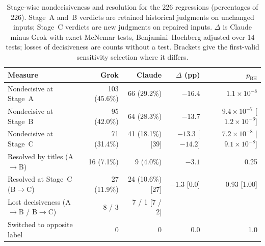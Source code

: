 \begin{table}[t]
\centering
\caption{Stage-wise nondecisiveness and resolution for the 226 regressions (percentages of 226). Stage~A and~B verdicts are retained historical judgments on unchanged inputs; Stage~C verdicts are new judgments on repaired inputs. $\Delta$ is Claude minus Grok with exact McNemar tests, Benjamini--Hochberg adjusted over 14 tests; losses of decisiveness are counts without a test. Brackets give the first-valid sensitivity selection where it differs.}
\label{tab:stage}
\small
\setlength{\tabcolsep}{4pt}
\begin{tabular}{lrrrr}
\toprule
Measure & Grok & Claude & $\Delta$ (pp) & $p_{\mathrm{BH}}$ \\
\midrule
Nondecisive at Stage~A & 103 (45.6\%) & 66 (29.2\%) & $-16.4$ & $1.1\times 10^{-8}$ \\
Nondecisive at Stage~B & 95 (42.0\%) & 64 (28.3\%) & $-13.7$ & $9.4\times 10^{-7}$ [$1.2\times 10^{-6}$] \\
Nondecisive at Stage~C & 71 (31.4\%) & 41 (18.1\%) [39] & $-13.3$ [$-14.2$] & $7.2\times 10^{-8}$ [$9.1\times 10^{-8}$] \\
Resolved by titles (A$\rightarrow$B) & 16 (7.1\%) & 9 (4.0\%) & $-3.1$ & 0.25 \\
Resolved at Stage~C (B$\rightarrow$C) & 27 (11.9\%) & 24 (10.6\%) [27] & $-1.3$ [$0.0$] & 0.93 [1.00] \\
Lost decisiveness (A$\rightarrow$B / B$\rightarrow$C) & 8 / 3 & 7 / 1 [7 / 2] & & \\
Switched to opposite label & 0 & 0 & 0.0 & 1.0 \\
\bottomrule
\end{tabular}
\end{table}
